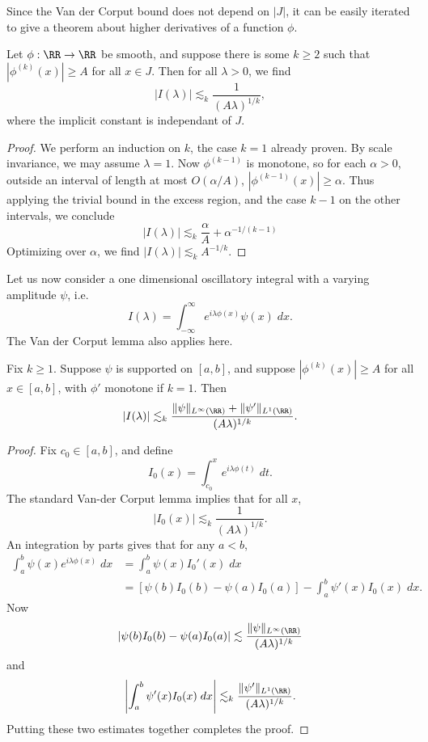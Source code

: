 Since the Van der Corput bound does not depend on $|J|$, it can be easily iterated to give a theorem about higher derivatives of a function $\phi$.

\begin{lemma}
  Let $\phi: \RR \to \RR$ be smooth, and suppose there is some $k \geq 2$ such that $|\phi^{(k)}(x)| \geq A$ for all $x \in J$. Then for all $\lambda > 0$, we find
  \[ |I(\lambda)| \lesssim_k \frac{1}{(A \lambda)^{1/k}}, \]
  where the implicit constant is independant of $J$.
\end{lemma}
\begin{proof}
  We perform an induction on $k$, the case $k = 1$ already proven. By scale invariance, we may assume $\lambda = 1$. Now $\phi^{(k-1)}$ is monotone, so for each $\alpha > 0$, outside an interval of length at most $O(\alpha/A)$, $|\phi^{(k-1)}(x)| \geq \alpha$. Thus applying the trivial bound in the excess region, and the case $k - 1$ on the other intervals, we conclude
  \[ |I(\lambda)| \lesssim_k \frac{\alpha}{A} + \alpha^{-1/(k-1)} \]
  Optimizing over $\alpha$, we find $|I(\lambda)| \lesssim_k A^{-1/k}$.
\end{proof}

Let us now consider a one dimensional oscillatory integral with a varying amplitude $\psi$, i.e.
%
\[ I(\lambda) = \int_{-\infty}^\infty e^{i \lambda \phi(x)} \psi(x)\; dx. \]
%
The Van der Corput lemma also applies here.

\begin{lemma}
  Fix $k \geq 1$. Suppose $\psi$ is supported on $[a,b]$, and suppose $|\phi^{(k)}(x)| \geq A$ for all $x \in [a,b]$, with $\phi'$ monotone if $k = 1$. Then
  \[ |I(\lambda)| \lesssim_k \frac{\| \psi \|_{L^\infty(\RR)} + \| \psi' \|_{L^1(\RR)}}{(A \lambda)^{1/k}}. \]
\end{lemma}
\begin{proof}
  Fix $c_0 \in [a,b]$, and define
  \[ I_0(x) = \int_{c_0}^x e^{i \lambda \phi(t)}\; dt. \]
  The standard Van-der Corput lemma implies that for all $x$,
  \[ |I_0(x)| \lesssim_k \frac{1}{(A \lambda)^{1/k}}. \]
  An integration by parts gives that for any $a < b$,
  \begin{align*}
    \int_a^b \psi(x) e^{i \lambda \phi(x)}\; dx &= \int_a^b \psi(x) I_0'(x)\; dx\\
    &= [\psi(b) I_0(b) - \psi(a) I_0(a)] - \int_a^b \psi'(x) I_0(x)\; dx.
  \end{align*}
  Now
  \[ |\psi(b) I_0(b) - \psi(a) I_0(a)| \lesssim \frac{\| \psi \|_{L^\infty(\RR)}}{(A \lambda)^{1/k}} \]
  and
  \[ \left| \int_a^b \psi'(x) I_0(x)\; dx \right| \lesssim_k \frac{\| \psi' \|_{L^1(\RR)}}{(A \lambda)^{1/k}}. \]
  Putting these two estimates together completes the proof.
\end{proof}

